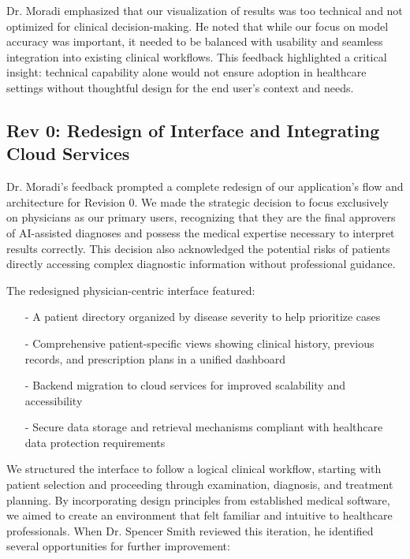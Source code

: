 \documentclass{article}
\begin{document}
\noindent Dr. Moradi emphasized that our visualization of results was too technical and not optimized for clinical decision-making. He noted that while our focus on model accuracy was important, it needed to be balanced with usability and seamless integration into existing clinical workflows. This feedback highlighted a critical insight: technical capability alone would not ensure adoption in healthcare settings without thoughtful design for the end user's context and needs.

\subsection{Rev 0: Redesign of Interface and Integrating Cloud Services}

Dr. Moradi's feedback prompted a complete redesign of our application's flow and architecture for Revision 0. We made the strategic decision to focus exclusively on physicians as our primary users, recognizing that they are the final approvers of AI-assisted diagnoses and possess the medical expertise necessary to interpret results correctly. This decision also acknowledged the potential risks of patients directly accessing complex diagnostic information without professional guidance.

\noindent The redesigned physician-centric interface featured:

\begin{itemize}
    \item[-] A patient directory organized by disease severity to help prioritize cases
    \item[-] Comprehensive patient-specific views showing clinical history, previous records, and prescription plans in a unified dashboard
    \item[-] Backend migration to cloud services for improved scalability and accessibility
    \item[-] Secure data storage and retrieval mechanisms compliant with healthcare data protection requirements
\end{itemize}

\noindent We structured the interface to follow a logical clinical workflow, starting with patient selection and proceeding through examination, diagnosis, and treatment planning. By incorporating design principles from established medical software, we aimed to create an environment that felt familiar and intuitive to healthcare professionals.
\noindent When Dr. Spencer Smith reviewed this iteration, he identified several opportunities for further improvement:
\end{document}
